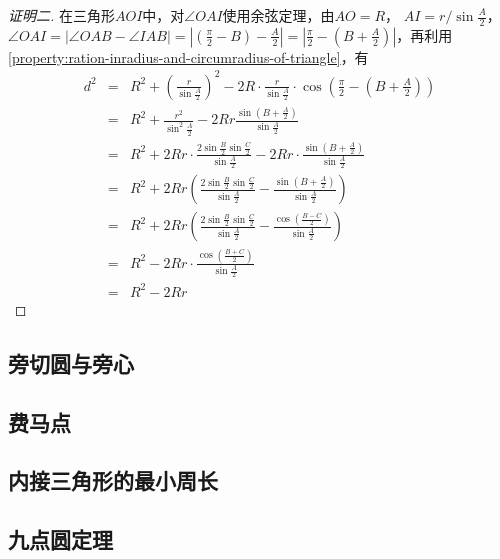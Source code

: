 \begin{proof}[证明二]
  在三角形$AOI$中，对$\angle OAI$使用余弦定理，由$AO=R$， $AI=r/\sin{\frac{A}{2}}$，$\angle OAI = \left| \angle OAB - \angle IAB \right| = \left| \left( \frac{\pi}{2}-B \right) - \frac{A}{2} \right| = \left| \frac{\pi}{2} - \left( B+\frac{A}{2} \right) \right|$，再利用\autoref{property:ration-inradius-and-circumradius-of-triangle}，有
  \begin{eqnarray*}
    d^2 & = & R^2+\left( \frac{r}{\sin{\frac{A}{2}}} \right)^2 - 2R \cdot \frac{r}{\sin{\frac{A}{2}}} \cdot \cos{\left( \frac{\pi}{2}-\left( B+\frac{A}{2} \right) \right)} \\
    & = & R^2 + \frac{r^2}{\sin^2 \frac{A}{2}} -2Rr \frac{\sin{\left( B+\frac{A}{2} \right)}}{\sin{\frac{A}{2}}} \\
    & = & R^2 + 2Rr \cdot \frac{2\sin{\frac{B}{2}}\sin{\frac{C}{2}}}{\sin{\frac{A}{2}}}-2Rr \cdot \frac{\sin{\left( B+\frac{A}{2} \right)}}{\sin{\frac{A}{2}}} \\
    & = & R^2 + 2Rr \left( \frac{2\sin{\frac{B}{2}}\sin{\frac{C}{2}}}{\sin{\frac{A}{2}}} - \frac{\sin{\left( B+\frac{A}{2} \right)}}{\sin{\frac{A}{2}}} \right) \\
    & = & R^2 + 2Rr \left( \frac{2\sin{\frac{B}{2}}\sin{\frac{C}{2}}}{\sin{\frac{A}{2}}} - \frac{\cos{\left( \frac{B-C}{2} \right)}}{\sin{\frac{A}{2}}} \right) \\
    & = & R^2 - 2Rr \cdot \frac{\cos{\left( \frac{B+C}{2} \right)}}{\sin{\frac{A}{2}}} \\
    & = & R^2 - 2Rr
  \end{eqnarray*}
\end{proof}

\subsection{旁切圆与旁心}
\label{sec:escenter}

\subsection{费马点}
\label{sec:fermat-point-of-triangle}

\subsection{内接三角形的最小周长}
\label{sec:min-girth-of-triangle-in-other}

\subsection{九点圆定理}
\label{sec:nine-point-theorem-of-triangle}


